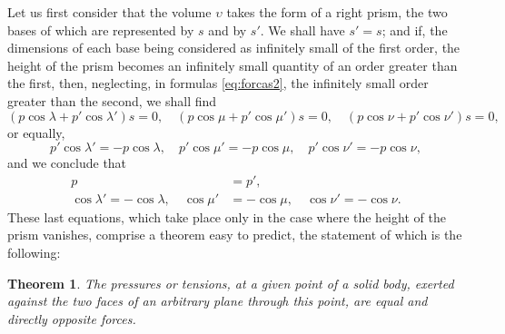 \documentclass[leqno,openright,smallroyalvopaper,8pt,twoside,showtrims]{memoir}
\newtheorem{thm}{Theorem}
\begin{document}
Let us first consider that the volume $\upsilon$ takes the form of a right prism, the two bases of which are represented by $s$ and by $s'$. We shall have $s'=s$; and if, the dimensions of each base being considered as infinitely small of the first order, the height of the prism becomes an infinitely small quantity of an order greater than the first, then, neglecting, in formulas \eqref{eq:forcas2}, the infinitely small order greater than the second, we shall find
\begin{equation*}
(p\cos\lambda+p'\cos\lambda')s=0, \quad(p\cos\mu+p'\cos\mu')s=0,\quad(p\cos\nu+p'\cos\nu')s=0,
\end{equation*}
or equally,
\begin{equation*}
p'\cos\lambda'=-p\cos\lambda, \quad p'\cos\mu'=-p\cos\mu,\quad p'\cos\nu'=-p\cos\nu,
\end{equation*}
and we conclude that
\begin{align*}
p&=p',\\
\cos\lambda'=-\cos\lambda,\quad \cos\mu'&=-\cos\mu,\quad \cos\nu'=-\cos\nu.
\end{align*}
These last equations, which take place only in the case where the height of the prism vanishes, comprise a theorem easy to predict, the statement of which is the following:
\begin{thm}
The pressures or tensions, at a given point of a solid body, exerted against the two faces of an arbitrary plane through this point, are equal and directly opposite forces.
\end{thm} 
\end{document}
